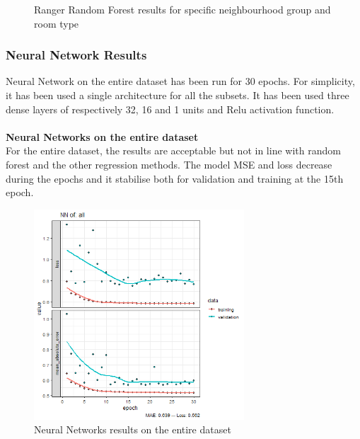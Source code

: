 \documentclass{FR16}
\begin{document}
\begin{figure}[!htb]
\begin{minipage}{0.48\textwidth}
   \end{minipage}
        \caption{Ranger Random Forest results for specific neighbourhood group and room type}\label{fig:18}

\end{figure}





\newpage
\subsubsection{Neural Network Results}
 Neural Network on the entire dataset has been run for 30 epochs. For simplicity, it has been used a single architecture for all the subsets. It has been used three dense layers of respectively 32, 16 and 1 units and Relu activation function.\\\\
\textbf{Neural Networks on the entire dataset }\\
\noindent
For the entire dataset, the results are acceptable but not in line with random forest and the other regression methods. The model MSE and loss decrease during the epochs and it stabilise both for validation and training at the 15th epoch.
\begin{figure}[h]
\centering
\includegraphics[width=0.7\textwidth]{figures/NN-all.PNG} 
 \caption{\label{fig:19} Neural Networks results on the entire dataset}
\end{figure}
\end{document}
